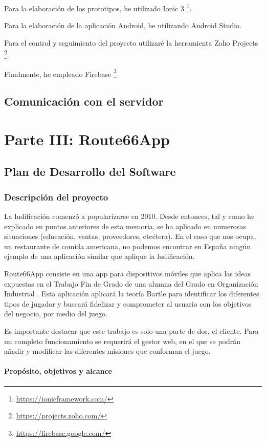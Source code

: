 \documentclass[twoside]{report}
\begin{document}
Para la elaboración de los prototipos, he utilizado Ionic 3 \footnote{\url{https://ionicframework.com/}}.

Para la elaboración de la aplicación Android, he utilizando Android Studio.

Para el control y seguimiento del proyecto utilizaré la herramienta Zoho Projects \footnote{\url{https://projects.zoho.com/}}.

Finalmente, he empleado Firebase \footnote{\url{https://firebase.google.com/}}

\section{Comunicación con el servidor}

\chapter{Parte III: Route66App}
\section{Plan de Desarrollo del Software}
\subsection{Descripción del proyecto}
La ludificación comenzó a popularizarse en 2010\cite{anatfg}. Desde entonces, tal y como he explicado en puntos anteriores de esta memoria, se ha aplicado en numerosas situaciones (educación, ventas, proveedores, etcétera). En el caso que nos ocupa, un restaurante de comida americana, no podemos encontrar en España ningún ejemplo de una aplicación similar que aplique la ludificación.

Route66App consiste en una app para dispositivos móviles que aplica las ideas expuestas en el Trabajo Fin de Grado de una alumna del Grado en Organización Industrial \cite{cristinatfg}. Esta aplicación aplicará la teoría Bartle para identificar los diferentes tipos de jugador y buscará fidelizar y comprometer al usuario con los objetivos del negocio, por medio del juego.

Es importante destacar que este trabajo es solo una parte de dos, el cliente. Para un completo funcionamiento se requerirá el gestor web, en el que se podrán añadir y modificar las diferentes misiones que conforman el juego.
 
\subsubsection{Propósito, objetivos y alcance}
\end{document}

